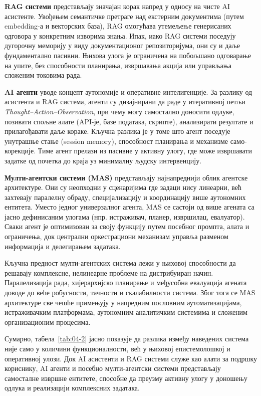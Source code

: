 \textbf{RAG системи} представљају значајан корак напред у односу на чисте AI асистенте. Увођењем семантичке претраге над екстерним документима (путем embedding-а и векторских база), RAG омогућава утемељење генерисаних одговора у конкретним изворима знања. Ипак, иако RAG системи поседују дугорочну меморију у виду документационог репозиторијума, они су и даље фундаментално пасивни. Њихова улога је ограничена на побољшано одговарање на упите, без способности планирања, извршавања акција или управљања сложеним токовима рада.

\textbf{AI агенти} уводе концепт аутономије и оперативне интелигенције. За разлику од асистента и RAG система, агенти су дизајнирани да раде у итеративној петљи \textit{Thought–Action–Observation}, при чему могу самостално доносити одлуке, позивати спољне алате (API-је, базе података, скрипте), анализирати резултате и прилагођавати даље кораке. Кључна разлика је у томе што агент поседује унутрашње стање (session memory), способност планирања и механизме само-корекције. Тиме агент прелази из пасивне у активну улогу, где може извршавати задатке од почетка до краја уз минималну људску интервенцију.

\textbf{Мулти-агентски системи (MAS)} представљају најнапреднији облик агентске архитектуре. Они су неопходни у сценаријима где задаци нису линеарни, већ захтевају паралелну обраду, специјализацију и координацију више аутономних ентитета. Уместо једног универзалног агента, MAS се састоји од више агената са јасно дефинисаним улогама (нпр. истраживач, планер, извршилац, евалуатор). Сваки агент је оптимизован за своју функцију путем посебног промпта, алата и ограничења, док централни оркестрациони механизам управља разменом информација и делегирањем задатака.

Кључна предност мулти-агентских система лежи у њиховој способности да решавају комплексне, нелинеарне проблеме на дистрибуиран начин. Паралелизација рада, хијерархијско планирање и међусобна евалуација агената доводе до веће робусности, тачности и скалабилности система. Због тога се MAS архитектуре све чешће примењују у напредним пословним аутоматизацијама, истраживачким платформама, аутономним аналитичким системима и сложеним организационим процесима.

Сумарно, табела~\ref{tab:04-2} јасно показује да разлика између наведених система није само у количини функционалности, већ у њиховој епистемолошкој и оперативној улози. Док AI асистенти и RAG системи служе као алати за подршку кориснику, AI агенти и посебно мулти-агентски системи представљају самосталне извршне ентитете, способне да преузму активну улогу у доношењу одлука и реализацији комплексних задатака.

